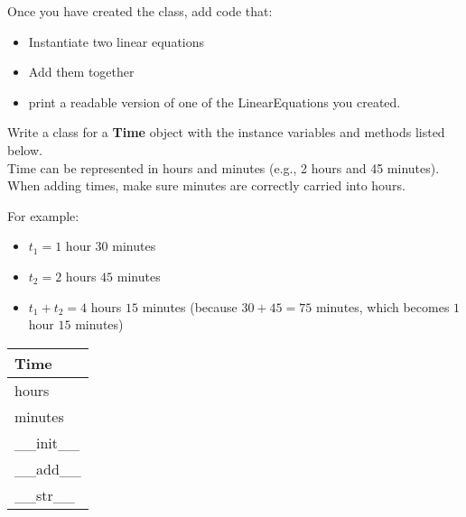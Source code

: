 		Once you have created the class, add code that:
		\begin{itemize}
			\item Instantiate two linear equations
			\item Add them together
			\item print a readable version of one of the LinearEquations you created.
		\end{itemize}



	\item
		Write a class for a \textbf{Time} object with the instance variables and methods listed 
		below.\\
		Time can be represented in hours and minutes (e.g., 2 hours and 45 minutes). \\
		When adding times, make sure minutes are correctly carried into hours.

		\begin{minipage}[t]{0.65\textwidth}
			For example:
			\begin{itemize}
				\item $t_1 = 1$ hour $30$ minutes
				\item $t_2 = 2$ hours $45$ minutes
				\item $t_1 + t_2 = 4$ hours $15$ minutes 
					(because $30 + 45 = 75$ minutes, which becomes $1$ hour $15$ minutes)
			\end{itemize}

		\end{minipage}
		\hfill
		\begin{minipage}[t]{0.32\textwidth}
			\vspace{.2em}
			\begin{flushright}
				\begin{tabular}{|l|}
					\hline
					Time \\ \hline
					hours \\
					minutes \\ \hline
					\_\_init\_\_ \\
					\_\_add\_\_ \\
					\_\_str\_\_ \\ \hline
				\end{tabular}
			\end{flushright}
		\end{minipage}
		
